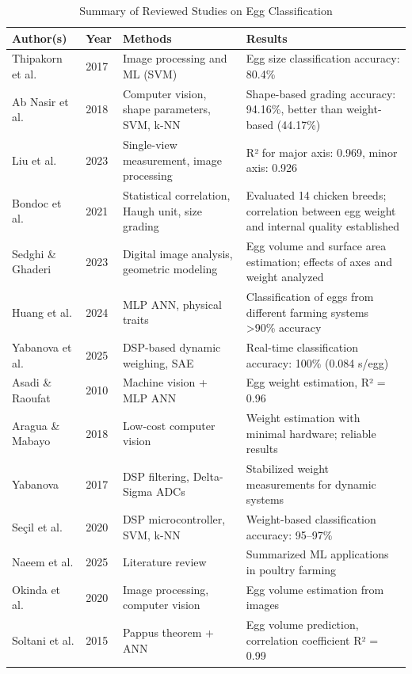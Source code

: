 \documentclass[conference]{IEEEtran}
\begin{document}
	\begin{table}[ht]
		\centering
		\caption{Summary of Reviewed Studies on Egg Classification}
		\begin{tabular}{|p{3cm}|p{1.5cm}|p{6cm}|p{4cm}|}
			\hline
			\textbf{Author(s)} & \textbf{Year} & \textbf{Methods} & \textbf{Results} \\
			\hline
			Thipakorn et al. & 2017 & Image processing and ML (SVM) & Egg size classification accuracy: 80.4\% \\
			\hline
			Ab Nasir et al. & 2018 & Computer vision, shape parameters, SVM, k-NN & Shape-based grading accuracy: 94.16\%, better than weight-based (44.17\%) \\
			\hline
			Liu et al. & 2023 & Single-view measurement, image processing & R² for major axis: 0.969, minor axis: 0.926 \\
			\hline
			Bondoc et al. & 2021 & Statistical correlation, Haugh unit, size grading & Evaluated 14 chicken breeds; correlation between egg weight and internal quality established \\
			\hline
			Sedghi \& Ghaderi & 2023 & Digital image analysis, geometric modeling & Egg volume and surface area estimation; effects of axes and weight analyzed \\
			\hline
			Huang et al. & 2024 & MLP ANN, physical traits & Classification of eggs from different farming systems >90\% accuracy \\
			\hline
			Yabanova et al. & 2025 & DSP-based dynamic weighing, SAE & Real-time classification accuracy: 100\% (0.084 s/egg) \\
			\hline
			Asadi \& Raoufat & 2010 & Machine vision + MLP ANN & Egg weight estimation, R² = 0.96 \\
			\hline
			Aragua \& Mabayo & 2018 & Low-cost computer vision & Weight estimation with minimal hardware; reliable results \\
			\hline
			Yabanova & 2017 & DSP filtering, Delta-Sigma ADCs & Stabilized weight measurements for dynamic systems \\
			\hline
			Seçil et al. & 2020 & DSP microcontroller, SVM, k-NN & Weight-based classification accuracy: 95–97\% \\
			\hline
			Naeem et al. & 2025 & Literature review & Summarized ML applications in poultry farming \\
			\hline
			Okinda et al. & 2020 & Image processing, computer vision & Egg volume estimation from images \\
			\hline
			Soltani et al. & 2015 & Pappus theorem + ANN & Egg volume prediction, correlation coefficient R² = 0.99 \\
			\hline
		\end{tabular}
		\label{tab:study_summary}
	\end{table}
	
\end{document}
